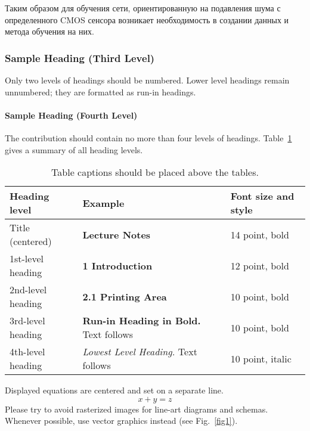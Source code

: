 \documentclass[runningheads]{llncs}
\begin{document}
Таким образом для обучения сети, ориентированную на подавления шума с определенного CMOS сенсора возникает необходимость в создании данных и метода обучения на них.

\subsubsection{Sample Heading (Third Level)} Only two levels of
headings should be numbered. Lower level headings remain unnumbered;
they are formatted as run-in headings.

\paragraph{Sample Heading (Fourth Level)}
The contribution should contain no more than four levels of
headings. Table~\ref{tab1} gives a summary of all heading levels.

\begin{table}
\caption{Table captions should be placed above the
tables.}\label{tab1}
\begin{tabular}{|l|l|l|}
\hline
Heading level &  Example & Font size and style\\
\hline
Title (centered) &  {\Large\bfseries Lecture Notes} & 14 point, bold\\
1st-level heading &  {\large\bfseries 1 Introduction} & 12 point, bold\\
2nd-level heading & {\bfseries 2.1 Printing Area} & 10 point, bold\\
3rd-level heading & {\bfseries Run-in Heading in Bold.} Text follows & 10 point, bold\\
4th-level heading & {\itshape Lowest Level Heading.} Text follows & 10 point, italic\\
\hline
\end{tabular}
\end{table}


\noindent Displayed equations are centered and set on a separate
line.
\begin{equation}
x + y = z
\end{equation}
Please try to avoid rasterized images for line-art diagrams and
schemas. Whenever possible, use vector graphics instead (see
Fig.~\ref{fig1}).

\end{document}

